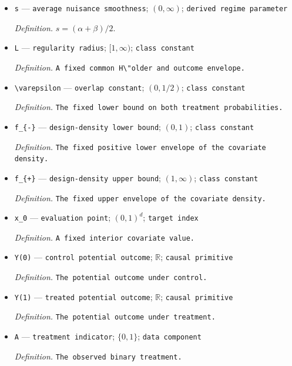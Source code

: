 \documentclass{article}
\begin{document}
\begin{itemize}
  \item \texttt{s} --- \texttt{average nuisance smoothness}; \((0,\infty)\); \texttt{derived regime parameter}
  \par\smallskip\noindent\emph{Definition.} \(s=(\alpha+\beta)/2\).
  \item \texttt{L} --- \texttt{regularity radius}; \([1,\infty)\); \texttt{class constant}
  \par\smallskip\noindent\emph{Definition.} \texttt{A fixed common H\textbackslash{}\allowbreak{}"older and outcome envelope.}
  \item \texttt{\textbackslash{}\allowbreak{}varepsilon} --- \texttt{overlap constant}; \((0,1/2)\); \texttt{class constant}
  \par\smallskip\noindent\emph{Definition.} \texttt{The fixed lower bound on both treatment probabilities.}
  \item \texttt{f\_\allowbreak{}\{-\allowbreak{}\}\allowbreak{}} --- \texttt{design-\allowbreak{}density lower bound}; \((0,1)\); \texttt{class constant}
  \par\smallskip\noindent\emph{Definition.} \texttt{The fixed positive lower envelope of the covariate density.}
  \item \texttt{f\_\allowbreak{}\{+\allowbreak{}\}\allowbreak{}} --- \texttt{design-\allowbreak{}density upper bound}; \((1,\infty)\); \texttt{class constant}
  \par\smallskip\noindent\emph{Definition.} \texttt{The fixed upper envelope of the covariate density.}
  \item \texttt{x\_\allowbreak{}0} --- \texttt{evaluation point}; \((0,1)^d\); \texttt{target index}
  \par\smallskip\noindent\emph{Definition.} \texttt{A fixed interior covariate value.}
  \item \texttt{Y(0)} --- \texttt{control potential outcome}; \(\mathbb{R}\); \texttt{causal primitive}
  \par\smallskip\noindent\emph{Definition.} \texttt{The potential outcome under control.}
  \item \texttt{Y(1)} --- \texttt{treated potential outcome}; \(\mathbb{R}\); \texttt{causal primitive}
  \par\smallskip\noindent\emph{Definition.} \texttt{The potential outcome under treatment.}
  \item \texttt{A} --- \texttt{treatment indicator}; \(\{0,1\}\); \texttt{data component}
  \par\smallskip\noindent\emph{Definition.} \texttt{The observed binary treatment.}

\end{itemize}
\end{document}
